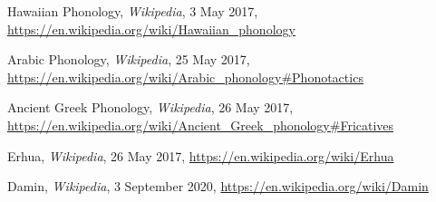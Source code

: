 \documentclass[11pt,letterpaper]{article}
\begin{document}
\pagebreak
\begin{thebibliography}{99}
   Hawaiian Phonology, \textit{Wikipedia}, 3 May 2017,
  \url{https://en.wikipedia.org/wiki/Hawaiian_phonology}
  
   Arabic Phonology, \textit{Wikipedia}, 25 May 2017,
  \url{https://en.wikipedia.org/wiki/Arabic_phonology#Phonotactics}
  
   Ancient Greek Phonology, \textit{Wikipedia}, 26 May 2017,
  \url{https://en.wikipedia.org/wiki/Ancient_Greek_phonology#Fricatives}

   Erhua, \textit{Wikipedia}, 26 May 2017,
  \url{https://en.wikipedia.org/wiki/Erhua}

   Damin, \textit{Wikipedia}, 3 September 2020,
  \url{https://en.wikipedia.org/wiki/Damin}
\end{thebibliography}
\end{document}

